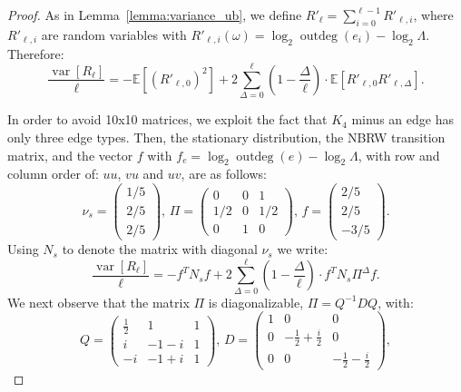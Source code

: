 \documentclass{article}
\newcommand{\E}{\mathbb{E}} %
\DeclareMathOperator{\var}{var}
\DeclareMathOperator{\outdeg}{outdeg}
\begin{document}
\begin{proof}
    As in Lemma~\ref{lemma:variance_ub}, we define $R'_\ell = \sum_{i=0}^{\ell-1} R'_{\ell,i}$, 
    where $R'_{\ell,i}$ are random variables with $R'_{\ell,i}(\omega) = \log_2 \outdeg(e_i) - \log_2\Lambda$.
    Therefore:
    \begin{equation*}
        \frac{\var[R_\ell]}{\ell} = - \E\!\left[ {(R'_{\ell,0})}^2\right] + 2 \sum_{\Delta=0}^{\ell} (1-\frac{\Delta}{\ell}) \cdot \E\!\left[ R'_{\ell,0} R'_{\ell,\Delta}\right].
    \end{equation*}

    In order to avoid 10x10 matrices, we exploit the fact that $K_4$ minus an edge has only three edge types.
    Then, the stationary distribution, the NBRW transition matrix, and the vector $f$ with $f_e = \log_2 \outdeg(e) - \log_2\Lambda$, 
    with row and column order of: $uu$, $vu$ and $uv$, are as follows:
    \begin{equation*}
        \nu_s = \begin{pmatrix} 1/5 \\ 2/5 \\ 2/5 \end{pmatrix}, \,
        \Pi = \begin{pmatrix} 0 & 0 & 1 \\ 1/2 & 0 & 1/2 \\ 0 & 1 & 0 \end{pmatrix}, \,
        f = \begin{pmatrix} 2/5 \\ 2/5 \\ -3/5\end{pmatrix}.
    \end{equation*}
    Using $N_s$ to denote the matrix with diagonal $\nu_s$ we write:
    \begin{equation}
        \frac{\var[R_\ell]}{\ell} = - f^T N_s f + 2 \sum_{\Delta=0}^{\ell} (1-\frac{\Delta}{\ell})  \cdot f^T N_s \Pi^\Delta f.
    \end{equation}
    We next observe that the matrix $\Pi$ is diagonalizable, $\Pi = Q^{-1} D Q$, with:
    \begin{equation*}
        Q = \begin{pmatrix} \frac{1}{2} & 1 & 1 \\ i & -1-i & 1 \\ -i & -1+i & 1 \end{pmatrix}, \,
        D = \begin{pmatrix} 1 & 0 & 0 \\ 0 & -\frac{1}{2}+\frac{i}{2} & 0 \\ 0 & 0 & -\frac{1}{2}-\frac{i}{2} \end{pmatrix},

\end{equation*}
\end{proof}
\end{document}
